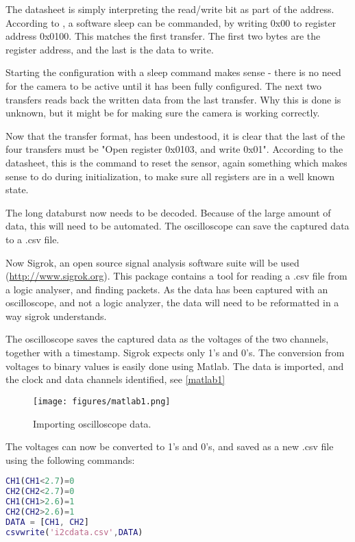 The datasheet is simply interpreting the read/write bit as part of the address.\\

According to \citep[p. 23]{picam_datasheet}, a software sleep can be commanded, by writing 0x00 to register address 0x0100. This matches the first transfer. The first two bytes are the register address, and the last is the data to write.

Starting the configuration with a sleep command makes sense - there is no need for the camera to be active until it has been fully configured. The next two transfers reads back the written data from the last transfer. Why this is done is unknown, but it might be for making sure the camera is working correctly.

Now that the transfer format, has been undestood, it is clear that the last of the four transfers must be "Open register 0x0103, and write 0x01". According to the datasheet, this is the command to reset the sensor, again something which makes sense to do during initialization, to make sure all registers are in a well known state.

The long databurst now needs to be decoded. Because of the large amount of data, this will need to be automated. The oscilloscope can save the captured data to a \gls{.csv} file.

Now Sigrok, an open source signal analysis software suite will be used (\url{http://www.sigrok.org}). This package contains a tool for reading a .csv file from a logic analyser, and finding \iic packets. As the data has been captured with an oscilloscope, and not a logic analyzer, the data will need to be reformatted in a way sigrok understands.

The oscilloscope saves the captured data as the voltages of the two channels, together with a timestamp. Sigrok expects only 1's and 0's. The conversion from voltages to binary values is easily done using Matlab. The data is imported, and the clock and data channels identified, see \autoref{matlab1}

\begin{figure}[H]
	\centering
	\texttt{[image: figures/matlab1.png]}
	\caption{Importing oscilloscope data.}
	\label{matlab1}
\end{figure}
\clearpage
The voltages can now be converted to 1's and 0's, and saved as a new .csv file using the following commands:
\begin{lstlisting}[caption={Matlab commands}, language=Matlab, label=matlab2]
CH1(CH1<2.7)=0
CH2(CH2<2.7)=0
CH1(CH1>2.6)=1
CH2(CH2>2.6)=1
DATA = [CH1, CH2]
csvwrite('i2cdata.csv',DATA)
\end{lstlisting}

